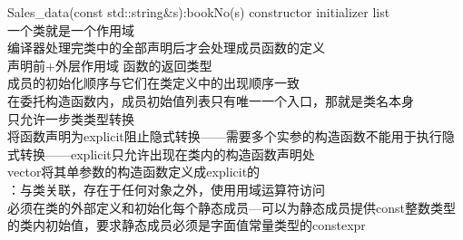 \documentclass{article}
\begin{document}
    Sales_data(const std::string\&s):bookNo(s){} constructor initializer list\\
    {\kaishu 一个类就是一个作用域}\\
    {\kaishu 编译器处理完类中的全部声明后才会处理成员函数的定义}\\
    {\kaishu 声明前+外层作用域  函数的返回类型}\\
    {\kaishu 成员的初始化顺序与它们在类定义中的出现顺序一致}\\
    {\kaishu 在委托构造函数内，成员初始值列表只有唯一一个入口，那就是类名本身}\\
    {\kaishu 只允许一步类类型转换}\\
    {\kaishu 将函数声明为explicit阻止隐式转换——需要多个实参的构造函数不能用于执行隐式转换——explicit只允许出现在类内的构造函数声明处}\\
    {\kaishu vector将其单参数的构造函数定义成explicit的}\\
    {：与类关联，存在于任何对象之外，使用用域运算符访问}\\
    {\kaishu 必须在类的外部定义和初始化每个静态成员---可以为静态成员提供const整数类型的类内初始值，要求静态成员必须是字面值常量类型的constexpr}
\end{document}
